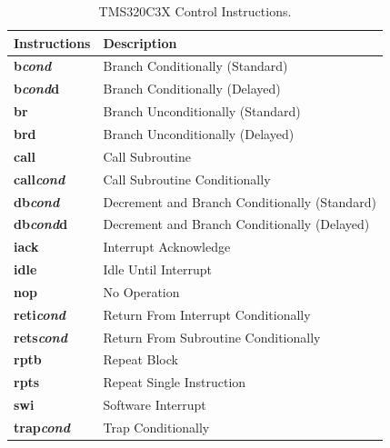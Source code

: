 \begin{table}[!p]
\begin{center}
	\small
	\begin{tabular}{|p{3.0cm}|p{10.0cm}|}
	\hline
	\textbf{Instructions} & \textbf{Description}\\
	\hline
	\textbf{b\textit{cond}} & Branch Conditionally (Standard)\\
	\hline
	\textbf{b\textit{cond}d} & Branch Conditionally (Delayed)\\
	\hline
	\textbf{br} & Branch Unconditionally (Standard)\\
	\hline
	\textbf{brd} & Branch Unconditionally (Delayed)\\
	\hline
	\textbf{call} & Call Subroutine\\
	\hline
	\textbf{call\textit{cond}} & Call Subroutine Conditionally\\
	\hline
	\textbf{db\textit{cond}} & Decrement and Branch Conditionally (Standard)\\
	\hline
	\textbf{db\textit{cond}d} & Decrement and Branch Conditionally (Delayed)\\
	\hline
	\textbf{iack} & Interrupt Acknowledge\\
	\hline
	\textbf{idle} & Idle Until Interrupt\\
	\hline
	\textbf{nop} & No Operation\\
	\hline
	\textbf{reti\textit{cond}} & Return From Interrupt Conditionally\\
	\hline
	\textbf{rets\textit{cond}} & Return From Subroutine Conditionally\\
	\hline
	\textbf{rptb} & Repeat Block\\
	\hline
	\textbf{rpts} & Repeat Single Instruction\\
	\hline
	\textbf{swi} & Software Interrupt\\
	\hline
	\textbf{trap\textit{cond}} & Trap Conditionally\\
	\hline
	\end{tabular}
	\caption{\label{table:tms320c3x_control_instructions} TMS320C3X Control Instructions.}
\end{center}
\end{table}

